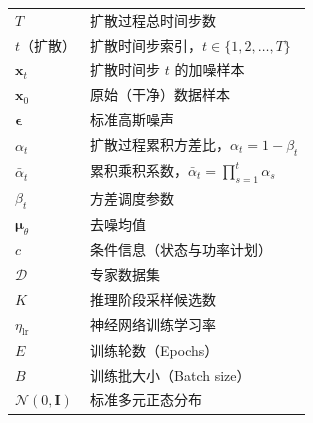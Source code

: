 \begin{longtable}{@{}l p{10cm}@{}}
$T$ & 扩散过程总时间步数 \\
$t$（扩散） & 扩散时间步索引，$t \in \{1, 2, \dots, T\}$ \\
$\mathbf{x}_t$ & 扩散时间步 $t$ 的加噪样本 \\
$\mathbf{x}_0$ & 原始（干净）数据样本 \\
$\boldsymbol{\epsilon}$ & 标准高斯噪声 \\
$\alpha_t$ & 扩散过程累积方差比，$\alpha_t = 1 - \beta_t$ \\
$\bar{\alpha}_t$ & 累积乘积系数，$\bar{\alpha}_t = \prod_{s=1}^{t}\alpha_s$ \\
$\beta_t$ & 方差调度参数 \\
$\boldsymbol{\mu}_\theta$ & 去噪均值 \\
$c$ & 条件信息（状态与功率计划） \\
$\mathcal{D}$ & 专家数据集 \\
$K$ & 推理阶段采样候选数 \\
\addlinespace
$\eta_{\text{lr}}$ & 神经网络训练学习率 \\
$E$ & 训练轮数（Epochs） \\
$B$ & 训练批大小（Batch size） \\
$\mathcal{N}(0, \mathbf{I})$ & 标准多元正态分布 \\
\end{longtable}
